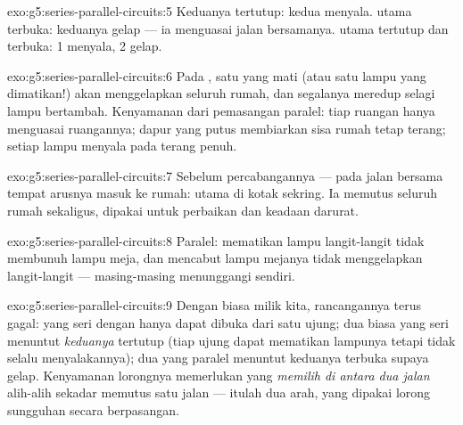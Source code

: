 \begin{solution}{exo:g5:series-parallel-circuits:5}
Keduanya tertutup: kedua  menyala.  utama terbuka:
keduanya gelap --- ia menguasai jalan bersamanya.  utama
tertutup dan   terbuka:  1 menyala,  2 gelap.
\end{solution}

\begin{solution}{exo:g5:series-parallel-circuits:6}
Pada , satu  yang mati (atau satu lampu yang
dimatikan!) akan menggelapkan seluruh rumah, dan segalanya meredup
selagi lampu bertambah. Kenyamanan dari pemasangan paralel: 
tiap ruangan hanya menguasai ruangannya;  dapur yang putus
membiarkan sisa rumah tetap terang; setiap lampu menyala pada terang
penuh.
\end{solution}

\begin{solution}{exo:g5:series-parallel-circuits:7}
Sebelum percabangannya --- pada jalan bersama tempat arusnya masuk ke
rumah:  utama di kotak sekring. Ia memutus seluruh rumah
sekaligus, dipakai untuk perbaikan dan keadaan darurat.
\end{solution}

\begin{solution}{exo:g5:series-parallel-circuits:8}
Paralel: mematikan lampu langit-langit tidak membunuh lampu meja, dan
mencabut lampu mejanya tidak menggelapkan langit-langit ---
masing-masing menunggangi  sendiri.
\end{solution}

\begin{solution}{exo:g5:series-parallel-circuits:9}
Dengan  biasa milik kita, rancangannya terus gagal: 
yang seri dengan  hanya dapat dibuka dari satu ujung; dua
 biasa yang seri menuntut \emph{keduanya} tertutup (tiap ujung
dapat mematikan lampunya tetapi tidak selalu menyalakannya); dua yang
paralel menuntut keduanya terbuka supaya gelap. Kenyamanan lorongnya
memerlukan  yang \emph{memilih di antara dua jalan} alih-alih
sekadar memutus satu jalan --- itulah  dua arah, yang dipakai
lorong sungguhan secara berpasangan.
\end{solution}

